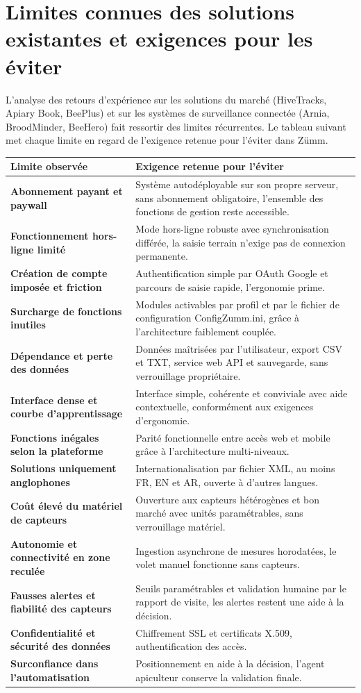 \section{Limites connues des solutions existantes et exigences pour les éviter}
L'analyse des retours d'expérience sur les solutions du marché (HiveTracks,
Apiary Book, BeePlus) et sur les systèmes de surveillance connectée (Arnia,
BroodMinder, BeeHero) fait ressortir des limites récurrentes. Le tableau suivant
met chaque limite en regard de l'exigence retenue pour l'éviter dans Zümm.
\begin{xltabular}{\textwidth}{>{\bfseries}p{5.2cm} X}
\toprule
\textbf{Limite observée} & \textbf{Exigence retenue pour l'éviter} \\
\midrule
\endhead
Abonnement payant et paywall & Système autodéployable sur son propre serveur, sans abonnement obligatoire, l'ensemble des fonctions de gestion reste accessible. \\
Fonctionnement hors-ligne limité & Mode hors-ligne robuste avec synchronisation différée, la saisie terrain n'exige pas de connexion permanente. \\
Création de compte imposée et friction & Authentification simple par OAuth Google et parcours de saisie rapide, l'ergonomie prime. \\
Surcharge de fonctions inutiles & Modules activables par profil et par le fichier de configuration ConfigZumm.ini, grâce à l'architecture faiblement couplée. \\
Dépendance et perte des données & Données maîtrisées par l'utilisateur, export CSV et TXT, service web API et sauvegarde, sans verrouillage propriétaire. \\
Interface dense et courbe d'apprentissage & Interface simple, cohérente et conviviale avec aide contextuelle, conformément aux exigences d'ergonomie. \\
Fonctions inégales selon la plateforme & Parité fonctionnelle entre accès web et mobile grâce à l'architecture multi-niveaux. \\
Solutions uniquement anglophones & Internationalisation par fichier XML, au moins FR, EN et AR, ouverte à d'autres langues. \\
Coût élevé du matériel de capteurs & Ouverture aux capteurs hétérogènes et bon marché avec unités paramétrables, sans verrouillage matériel. \\
Autonomie et connectivité en zone reculée & Ingestion asynchrone de mesures horodatées, le volet manuel fonctionne sans capteurs. \\
Fausses alertes et fiabilité des capteurs & Seuils paramétrables et validation humaine par le rapport de visite, les alertes restent une aide à la décision. \\
Confidentialité et sécurité des données & Chiffrement SSL et certificats X.509, authentification des accès. \\
Surconfiance dans l'automatisation & Positionnement en aide à la décision, l'agent apiculteur conserve la validation finale. \\
\bottomrule
\end{xltabular}

